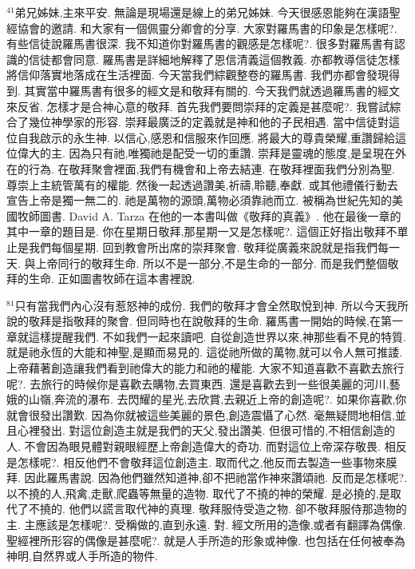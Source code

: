 \documentclass{book}
\begin{document}
$^{41}$弟兄姊妹,主來平安.
無論是現場還是線上的弟兄姊妹.
今天很感恩能夠在漢語聖經協會的邀請.
和大家有一個佩靈分卿會的分享.
大家對羅馬書的印象是怎樣呢?.
有些信徒說羅馬書很深.
我不知道你對羅馬書的觀感是怎樣呢?.
很多對羅馬書有認識的信徒都會同意.
羅馬書是詳細地解釋了恩信清義這個教義.
亦都教導信徒怎樣將信仰落實地落成在生活裡面.
今天當我們綜觀整卷的羅馬書.
我們亦都會發現得到.
其實當中羅馬書有很多的經文是和敬拜有關的.
今天我們就透過羅馬書的經文來反省.
怎樣才是合神心意的敬拜.
首先我們要問崇拜的定義是甚麼呢?.
我嘗試綜合了幾位神學家的形容.
崇拜最廣泛的定義就是神和他的子民相遇.
當中信徒對這位自我啟示的永生神.
以信心,感恩和信服來作回應.
將最大的尊貴榮耀,重讚歸給這位偉大的主.
因為只有祂,唯獨祂是配受一切的重讚.
崇拜是靈魂的態度,是呈現在外在的行為.
在敬拜聚會裡面,我們有機會和上帝去結連.
在敬拜裡面我們分別為聖.
尊崇上主統管萬有的權能.
然後一起透過讚美,祈禱,聆聽,奉獻.
或其他禮儀行動去宣告上帝是獨一無二的.
祂是萬物的源頭,萬物必須靠祂而立.
被稱為世紀先知的美國牧師圖書.
David A. Tarza 在他的一本書叫做《敬拜的真義》.
他在最後一章的其中一章的題目是.
你在星期日敬拜,那星期一又是怎樣呢?.
這個正好指出敬拜不單止是我們每個星期.
回到教會所出席的崇拜聚會.
敬拜從廣義來說就是指我們每一天.
與上帝同行的敬拜生命.
所以不是一部分,不是生命的一部分.
而是我們整個敬拜的生命.
正如圖書牧師在這本書裡說.

$^{81}$只有當我們內心沒有惹怒神的成份.
我們的敬拜才會全然取悅到神.
所以今天我所說的敬拜是指敬拜的聚會.
但同時也在說敬拜的生命.
羅馬書一開始的時候,在第一章就這樣提醒我們.
不如我們一起來讀吧.
自從創造世界以來,神那些看不見的特質.
就是祂永恆的大能和神聖,是顯而易見的.
這從祂所做的萬物,就可以令人無可推諉.
上帝藉著創造讓我們看到祂偉大的能力和祂的權能.
大家不知道喜歡不喜歡去旅行呢?.
去旅行的時候你是喜歡去購物,去買東西.
還是喜歡去到一些很美麗的河川,藝娥的山嶺,奔流的瀑布.
去閃耀的星光,去欣賞,去親近上帝的創造呢?.
如果你喜歡,你就會很發出讚歎.
因為你就被這些美麗的景色,創造震懾了心然.
毫無疑問地相信,並且心裡發出.
對這位創造主就是我們的天父,發出讚美.
但很可惜的,不相信創造的人.
不會因為眼見體對親眼經歷上帝創造偉大的奇功.
而對這位上帝深存敬畏.
相反是怎樣呢?.
相反他們不會敬拜這位創造主.
取而代之,他反而去製造一些事物來膜拜.
因此羅馬書說.
因為他們雖然知道神,卻不把祂當作神來讚頌祂.
反而是怎樣呢?.
以不撓的人,飛禽,走獸,爬蟲等無量的造物.
取代了不撓的神的榮耀.
是必撓的,是取代了不撓的.
他們以謊言取代神的真理.
敬拜服侍受造之物.
卻不敬拜服侍那造物的主.
主應該是怎樣呢?.
受稱做的,直到永遠.
對.
經文所用的造像,或者有翻譯為偶像.
聖經裡所形容的偶像是甚麼呢?.
就是人手所造的形象或神像.
也包括在任何被奉為神明,自然界或人手所造的物件.
\end{document}
